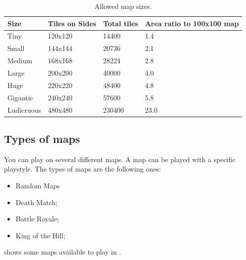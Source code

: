 \begin{table}[ht]
    \centering
    \begin{tabular}{llll}
        \toprule
        Size & Tiles on Sides & Total tiles & Area ratio to 100x100 map \\
        \midrule
        Tiny        & 120x120              & 14400           & 1.4 \\
        Small       & 144x144              & 20736           & 2.1 \\
        Medium      & 168x168              & 28224           & 2.8 \\
        Large       & 200x200              & 40000           & 4.0 \\
        Huge        & 220x220              & 48400           & 4.8 \\
        Gigantic    & 240x240              & 57600           & 5.8 \\
        Ludicruous  & 480x480              & 230400          & 23.0 \\
        \bottomrule
    \end{tabular}
    \caption{Allowed map sizes.}
    \label{tbl:size}
\end{table}

\subsection{Types of maps}

You can play \aoe{} on several different maps. A map can be played with a specific playstyle. The types of maps are the following ones:

\begin{itemize}
    \item Random Maps
    \item Death Match;
    \item Battle Royale;
    \item King of the Hill;
\end{itemize}

 shows some maps available to play in \aoe{}.

